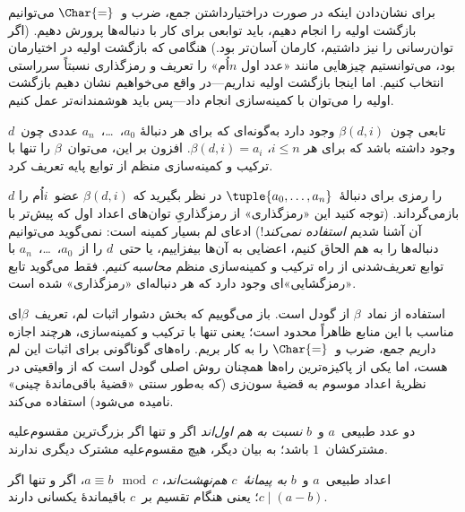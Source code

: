\documentclass[../../../include/open-logic-section]{subfiles}
\begin{document}


برای نشان‌دادن اینکه در صورت دراختیارداشتن جمع، ضرب و~$\Char{=}$
می‌توانیم بازگشت اولیه را انجام دهیم، باید توابعی برای کار با دنباله‌ها
پرورش دهیم. (اگر توان‌رسانی را نیز داشتیم، کارمان آسان‌تر بود.) هنگامی
که بازگشت اولیه در اختیارمان بود، می‌توانستیم چیزهایی مانند «عدد اول
$n$اُم» را تعریف و رمزگذاری نسبتاً سرراستی انتخاب کنیم. اما اینجا
بازگشت اولیه نداریم---در واقع می‌خواهیم نشان دهیم بازگشت اولیه را
می‌توان با کمینه‌سازی انجام داد---پس باید هوشمندانه‌تر عمل کنیم.

\begin{lem}
تابعی چون~$\beta(d,i)$ وجود دارد به‌گونه‌ای که برای هر دنبالهٔ
$a_0$،~\dots،~$a_n$ عددی چون~$d$ وجود داشته باشد که برای هر
$i\le n$، $\beta(d,i)=a_i$. افزون بر این، می‌توان~$\beta$ را تنها با
ترکیب و کمینه‌سازی منظم از توابع پایه تعریف کرد.
\end{lem}

$d$ را رمزی برای دنبالهٔ~$\tuple{a_0,\dots,a_n}$ در نظر بگیرید که
$\beta(d,i)$ عضو~$i$اُم را بازمی‌گرداند. (توجه کنید این «رمزگذاری»
از رمزگذاریِ توان‌های اعداد اول که پیش‌تر با آن آشنا شدیم
\emph{استفاده نمی‌کند}!) ادعای لم بسیار کمینه است: نمی‌گوید می‌توانیم
دنباله‌ها را به هم الحاق کنیم، اعضایی به آن‌ها بیفزاییم، یا حتی~$d$
را از~$a_0$،~\dots،~$a_n$ با توابع تعریف‌شدنی از راه ترکیب و
کمینه‌سازی منظم \emph{محاسبه کنیم}. فقط می‌گوید تابع «رمزگشایی»ای
وجود دارد که هر دنباله‌ای «رمزگذاری» شده است.

استفاده از نماد~$\beta$ از گودل است. باز می‌گوییم که بخش دشوار اثبات
لم، تعریف~$\beta$ای مناسب با این منابع ظاهراً محدود است؛ یعنی تنها با
ترکیب و کمینه‌سازی، هرچند اجازه داریم جمع، ضرب و~$\Char{=}$ را به کار
بریم. راه‌های گوناگونی برای اثبات این لم هست، اما یکی از پاکیزه‌ترین
راه‌ها همچنان روش اصلی گودل است که از واقعیتی در نظریهٔ اعداد موسوم
به قضیهٔ سون‌زی (که به‌طور سنتی «قضیهٔ باقی‌ماندهٔ چینی» نامیده
می‌شود) استفاده می‌کند.

\begin{defn}
دو عدد طبیعی~$a$ و~$b$ \emph{نسبت به هم اول‌اند} اگر و تنها اگر
بزرگ‌ترین مقسوم‌علیه مشترکشان~$1$ باشد؛ به بیان دیگر، هیچ مقسوم‌علیه
مشترک دیگری ندارند.
\end{defn}

\begin{defn}
اعداد طبیعی~$a$ و~$b$ \emph{به پیمانهٔ~$c$ هم‌نهشت‌اند}،
$a\equiv b\mod c$، اگر و تنها اگر $c\mid(a-b)$؛ یعنی هنگام تقسیم
بر~$c$ باقیماندهٔ یکسانی دارند.
\end{defn}
\end{document}
